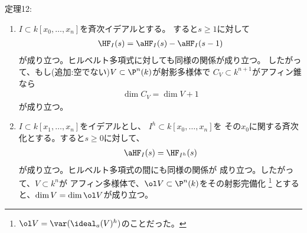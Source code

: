 \begin{framed}
  定理12:
  \begin{enumerate}[label=(\roman*)]
    \item
    $I\subset k[x_0,\dots,x_n]$を斉次イデアルとする。
    すると$s\ge 1$に対して
    \begin{align}
      \HF_I(s) = \aHF_I(s) - \aHF_I(s-1)
    \end{align}
    が成り立つ。ヒルベルト多項式に対しても同様の関係が成り立つ。
    したがって、もし(追加:空でない)$V\subset \P^n(k)$が射影多様体で
    $C_V \subset k^{n+1}$がアフィン錐なら
    \begin{align}
      \dim C_V = \dim V + 1
    \end{align}
    が成り立つ。
    \item
    $I\subset k[x_1,\dots,x_n]$をイデアルとし、
    $I^h \subset k[x_0,\dots,x_n]$を
    その$x_0$に関する斉次化とする。すると$s\ge 0$に対して、
    \begin{align}
      \aHF_I(s) = \HF_{I^h}(s)
    \end{align}
    が成り立つ。ヒルベルト多項式の間にも同様の関係が
    成り立つ。したがって、$V\subset k^n$が
    アフィン多様体で、$\ol V\subset \P^n(k)$をその射影完備化
    \footnote{$\ol V = \var(\ideal_a(V)^h)$のことだった。}
    とすると、$\dim V = \dim \ol V$が成り立つ。
  \end{enumerate}
\end{framed}

